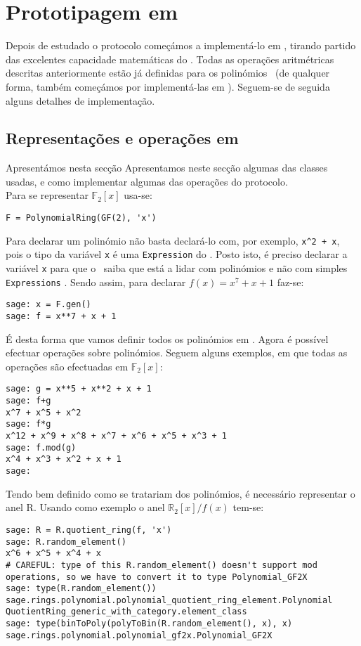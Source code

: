 \section{Prototipagem em \sage}
Depois de estudado o protocolo começámos a implementá-lo em \sage, tirando partido das excelentes capacidade matemáticas do \sage. Todas as operações aritmétricas descritas anteriormente estão já definidas para os polinómios \sage\ (de qualquer forma, também começámos por implementá-las em \sage). Seguem-se de seguida alguns detalhes de implementação.
\subsection{Representações e operações em \sage}
Apresentámos nesta secção 
Apresentamos neste secção algumas das classes usadas, e como implementar algumas das operações do protocolo.\\
Para se representar $\mathbb{F}_2[x]$ usa-se:
\begin{lstlisting}[style=sage]
F = PolynomialRing(GF(2), 'x')
\end{lstlisting}
Para declarar um polinómio não basta declará-lo com, por exemplo, \verb|x^2 + x|, pois o tipo da variável \verb|x| é uma \verb|Expression| do \sage. Posto isto, é preciso declarar a variável \verb|x| para que o \sage\ saiba que está a lidar com polinómios e não com simples \verb|Expressions| \sage. Sendo assim, para declarar $f(x) = x^7 + x + 1$ faz-se:
\begin{lstlisting}[style=sage]
sage: x = F.gen()
sage: f = x**7 + x + 1
\end{lstlisting}
É desta forma que vamos definir todos os polinómios em \sage. Agora é possível efectuar operações sobre polinómios. Seguem alguns exemplos, em que todas as operações são efectuadas em $\mathbb{F}_2[x]$:
\begin{lstlisting}[style=sage]
sage: g = x**5 + x**2 + x + 1
sage: f+g
x^7 + x^5 + x^2
sage: f*g
x^12 + x^9 + x^8 + x^7 + x^6 + x^5 + x^3 + 1
sage: f.mod(g)
x^4 + x^3 + x^2 + x + 1
sage: 
\end{lstlisting}
Tendo bem definido como se tratariam dos polinómios, é necessário representar o anel \textsf{R}. Usando como exemplo o anel $\mathbb{R}_2[x]/f(x)$ tem-se:
\begin{lstlisting}[style=sage]
sage: R = R.quotient_ring(f, 'x')
sage: R.random_element()
x^6 + x^5 + x^4 + x
# CAREFUL: type of this R.random_element() doesn't support mod operations, so we have to convert it to type Polynomial_GF2X
sage: type(R.random_element())
sage.rings.polynomial.polynomial_quotient_ring_element.Polynomial
QuotientRing_generic_with_category.element_class
sage: type(binToPoly(polyToBin(R.random_element(), x), x)
sage.rings.polynomial.polynomial_gf2x.Polynomial_GF2X
\end{lstlisting}

